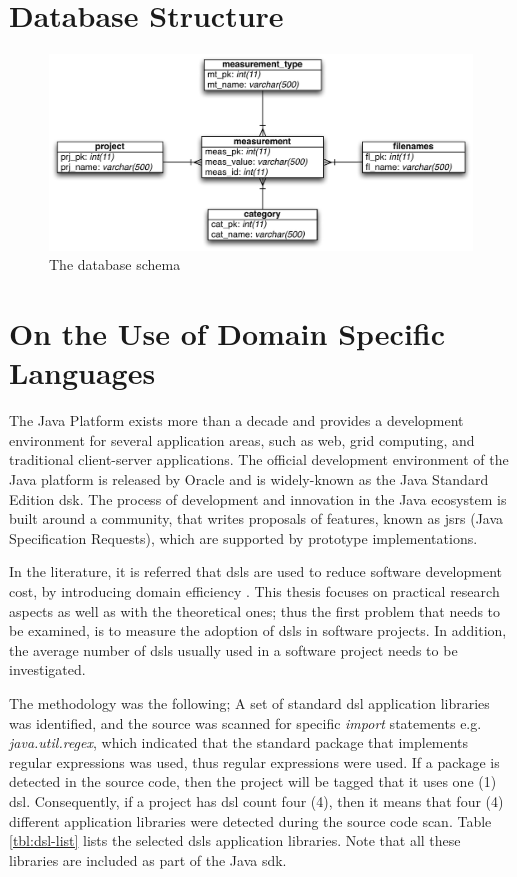 \documentclass{sig-alternate}
\begin{document}
\section{Database Structure}
\label{sec:db}

\begin{figure}
\centering
\includegraphics[scale=0.7]{database-schema}
\caption{The database schema}
\label{fig:database-schema}
\end{figure}

\section{On the Use of Domain Specific Languages}
\label{sec:dsl}

The Java Platform exists more than a decade and provides a development environment for several application areas, such as web, grid computing, and traditional client-server applications. The official development environment of the Java platform is released by Oracle and is widely-known as the Java Standard Edition {\sc dsk}. The process of development and innovation in the Java ecosystem is built around a community, that writes proposals of features, known as {\sc jsr}s (Java Specification Requests), which are supported by prototype implementations.

In the literature, it is referred that {\sc dsl}s are used to reduce software development cost, by introducing domain efficiency \cite{MHS05}. This thesis focuses on practical research aspects as well as with the theoretical ones; thus the first problem that needs to be examined, is to measure the adoption of {\sc dsl}s in software projects. In addition, the average number of {\sc dsl}s usually used in a software project needs to be investigated.

The methodology was the following; A set of standard {\sc dsl} application libraries was identified, and the source was scanned for specific \textit{import} statements e.g. \textit{java.util.regex}, which indicated that the standard package that implements regular expressions was used, thus regular expressions were used. If a package is detected in the source code, then the project will be tagged that it uses one (1) {\sc dsl}. Consequently, if a project has {\sc dsl} count four (4), then it means that four (4) different application libraries were detected during the source code scan. Table \ref{tbl:dsl-list} lists the selected {\sc dsl}s application libraries. Note that all these libraries are included as part of the Java {\sc sdk}.
\end{document}
